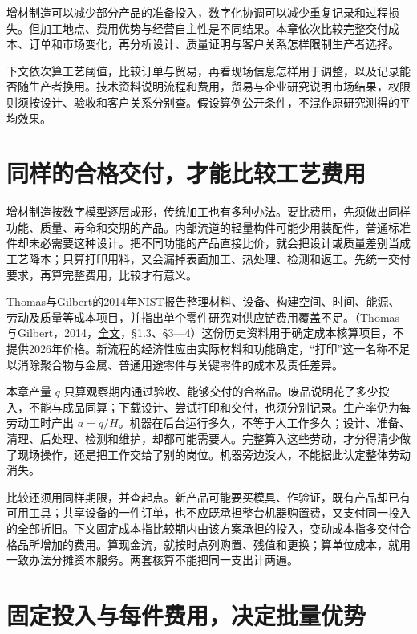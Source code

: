 \documentclass[UTF8,fontset=windows,12pt,a4paper,oneside,openany]{ctexbook}
\begin{document}
增材制造可以减少部分产品的准备投入，数字化协调可以减少重复记录和过程损失。但加工地点、费用优势与经营自主性是不同结果。本章依次比较完整交付成本、订单和市场变化，再分析设计、质量证明与客户关系怎样限制生产者选择。

下文依次算工艺阈值，比较订单与贸易，再看现场信息怎样用于调整，以及记录能否随生产者换用。技术资料说明流程和费用，贸易与企业研究说明市场结果，权限则须按设计、验收和客户关系分别查。假设算例公开条件，不混作原研究测得的平均效果。

\section{同样的合格交付，才能比较工艺费用}

增材制造按数字模型逐层成形，传统加工也有多种办法。要比费用，先须做出同样功能、质量、寿命和交期的产品。内部流道的轻量构件可能少用装配件，普通标准件却未必需要这种设计。把不同功能的产品直接比价，就会把设计或质量差别当成工艺降本；只算打印用料，又会漏掉表面加工、热处理、检测和返工。先统一交付要求，再算完整费用，比较才有意义。

Thomas与Gilbert的2014年NIST报告整理材料、设备、构建空间、时间、能源、劳动及质量等成本项目，并指出单个零件研究对供应链费用覆盖不足。（Thomas与Gilbert，2014，\href{https://nvlpubs.nist.gov/nistpubs/specialpublications/nist.sp.1176.pdf}{全文}，§1.3、§3—4）这份历史资料用于确定成本核算项目，不提供2026年价格。新流程的经济性应由实际材料和功能确定，“打印”这一名称不足以消除聚合物与金属、普通用途零件与关键零件的成本及责任差异。

本章产量 $q$ 只算观察期内通过验收、能够交付的合格品。废品说明花了多少投入，不能与成品同算；下载设计、尝试打印和交付，也须分别记录。生产率仍为每劳动工时产出 $a=q/H$。机器在后台运行多久，不等于人工作多久；设计、准备、清理、后处理、检测和维护，却都可能需要人。完整算入这些劳动，才分得清少做了现场操作，还是把工作交给了别的岗位。机器旁边没人，不能据此认定整体劳动消失。

比较还须用同样期限，并查起点。新产品可能要买模具、作验证，既有产品却已有可用工具；共享设备的一件订单，也不应既承担整台机器购置费，又支付同一投入的全部折旧。下文固定成本指比较期内由该方案承担的投入，变动成本指多交付合格品所增加的费用。算现金流，就按时点列购置、残值和更换；算单位成本，就用一致办法分摊资本服务。两套核算不能把同一支出计两遍。

\section{固定投入与每件费用，决定批量优势}
\end{document}
